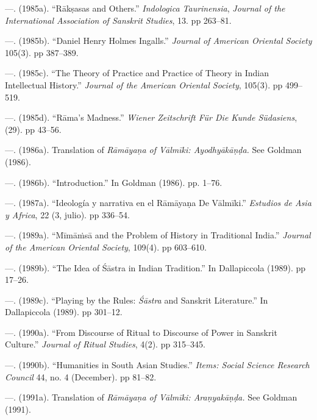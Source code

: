  \item —. (1985a). “Rākṣasas and Others.” \textit{Indologica Taurinensia}, \textit{Journal of the International Association of Sanskrit Studies}, 13. pp 263–81.

 \item —. (1985b). “Daniel Henry Holmes Ingalls.” \textit{Journal of American Oriental Society }105(3). pp 387–389.

 \item —. (1985c). “The Theory of Practice and Practice of Theory in Indian Intellectual History.” \textit{Journal of the American Oriental Society}, 105(3). pp 499–519.

 \item —. (1985d). “Rāma’s Madness.” \textit{Wiener Zeitschrift Für Die Kunde Südasiens}, (29). pp 43–56.

 \item —. (1986a). Translation of \textit{Rāmāyaṇa of Vālmīki: Ayodhyākāṇḍa. }See Goldman (1986).

 \item —. (1986b). “Introduction.” In Goldman (1986). pp. 1–76.

 \item —. (1987a). “Ideología y narrativa en el Rāmāyaṇa De Vālmīki.” \textit{Estudios de Asia y Africa}, 22 (3, julio). pp 336–54.

 \item —. (1989a). “Mīmāṁsā and the Problem of History in Traditional India.” \textit{Journal of the American Oriental Society}, 109(4). pp 603–610.

 \item —. (1989b). “The Idea of Śāstra in Indian Tradition.” In Dallapiccola (1989). pp 17–26.

 \item —. (1989c). “Playing by the Rules: \textit{Śāstra} and Sanskrit Literature.” In Dallapiccola (1989). pp 301–12.

 \item —. (1990a). “From Discourse of Ritual to Discourse of Power in Sanskrit Culture.” \textit{Journal of Ritual Studies}, 4(2). pp 315–345.

 \item —. (1990b). “Humanities in South Asian Studies.” \textit{Items: Social Science Research Council} 44, no. 4 (December). pp 81–82.

 \item —. (1991a). Translation of \textit{Rāmāyaṇa of Vālmīki: Araṇyakāṇḍa. }See Goldman (1991).

